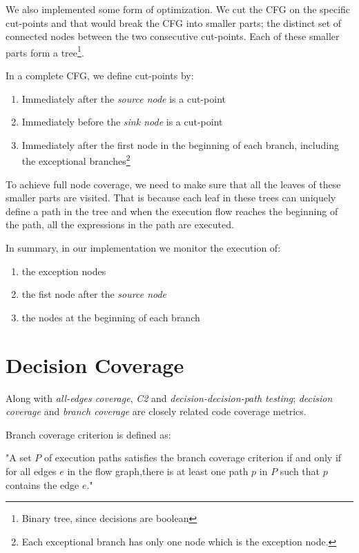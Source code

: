 \documentclass[12pt,a4paper]{report}
\begin{document}
We also implemented some form of optimization. We cut the CFG on the specific cut-points and that would break the CFG into smaller parts; the distinct set of connected nodes between the two consecutive cut-points. Each of these smaller parts form a tree\footnote{Binary tree, since decisions are boolean}.

In a complete CFG, we define cut-points by:  

\begin{enumerate}
 \item Immediately after the \emph{source node} is a cut-point
 \item Immediately before the \emph{sink node} is a cut-point
 \item Immediately after the first node in the beginning of each branch, including the exceptional branches\footnote{Each exceptional branch has only one node which is the exception node.} 
\end{enumerate}

To achieve full node coverage, we need to make sure that all the leaves of these smaller parts are visited. That is because each leaf in these trees can uniquely define a path in the tree and when the execution flow reaches the beginning of the path, all the expressions in the path are executed.

In summary, in our implementation we monitor the execution of:

\begin{enumerate}
 \item the exception nodes
 \item the fist node after the \emph{source node}
 \item the nodes at the beginning of each branch
\end{enumerate}

\section{Decision Coverage}
Along with \emph{all-edges coverage}, \emph{C2} and \emph{decision-decision-path testing}; \emph{decision coverage} and \emph{branch coverage} are closely related code coverage metrics.

Branch coverage criterion is defined as:

"A set $P$ of execution paths satisfies the branch coverage criterion if and only if for all edges $e$ in the flow graph,there is at least one path $p$ in $P$ such that $p$ contains the edge $e$."\cite{Zhu:1997:SUT:267580.267590}
\end{document}
